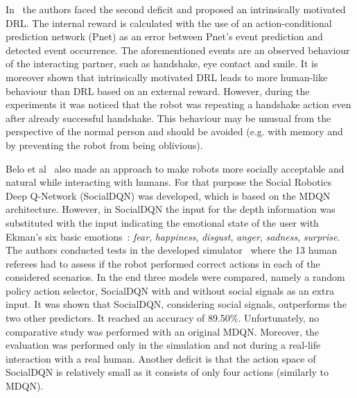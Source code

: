 \documentclass[thesis]{mas_proposal}
\begin{document}
In~\cite{Qureshi2018} the authors faced the second deficit and proposed an intrinsically motivated DRL. The internal reward is calculated with the use of an action-conditional prediction network (Pnet) as an error between Pnet's event prediction and detected event occurrence. The aforementioned events are an observed behaviour of the interacting partner, such as handshake, eye contact and smile. It is moreover shown that intrinsically motivated DRL leads to more human-like behaviour than DRL based on an external reward. However, during the experiments it was noticed that the robot was repeating a handshake action even after already successful handshake. This behaviour may be unusual from the perspective of the normal person and should be avoided (e.g. with memory and by preventing the robot from being oblivious).

Belo et al~\cite{Belo2022} also made an approach to make robots more socially acceptable and natural while interacting with humans. For that purpose the Social Robotics Deep Q-Network (SocialDQN) was developed, which is based on the MDQN architecture. However, in SocialDQN the input for the depth information was substituted with the input indicating the emotional state of the user with Ekman's six basic emotions~\cite{ekman1971constants}: \emph{fear}, \emph{happiness}, \emph{disgust}, \emph{anger}, \emph{sadness}, \emph{surprise}. The authors conducted tests in the developed simulator~\cite{Belo2021} where the 13 human referees had to assess if the robot performed correct actions in each of the considered scenarios. In the end three models were compared, namely a random policy action selector, SocialDQN with and without social signals as an extra input. It was shown that SocialDQN, considering social signals, outperforms the two other predictors. It reached an accuracy of 89.50\%. Unfortunately, no comparative study was performed with an original MDQN. Moreover, the evaluation was performed only in the simulation and not during a real-life interaction with a real human. Another deficit is that the action space of SocialDQN is relatively small as it consists of only four actions (similarly to MDQN).
 
\end{document}

